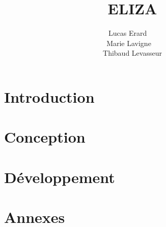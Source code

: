 \documentclass[a4paper,12pt]{article}
\title{ELIZA}
\author{Lucas Erard ~~\\ Marie Lavigne~~\\ Thibaud Levasseur}
\begin{document}
\maketitle
\newpage
\tableofcontents
\newpage
\section{Introduction}
\section{Conception}
\section{Développement}
\section{Annexes}
\end{document}
